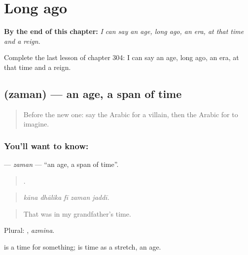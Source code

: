 
\chapter{Long ago}
\label{ch:ar-long-ago}

\begin{chapteropening}
\textbf{By the end of this chapter:} \emph{I can say an age, long ago, an era, at that time and a reign.}

Complete the last lesson of chapter 304: I can say an age, long ago, an era, at that time and a reign.
\end{chapteropening}

\section[\texorpdfstring{\ar{زمن} (zaman)}{زمن (zaman)}]{ (zaman) — an age, a span of time}

\label{lesson:AR-C304-zaman}



\begin{quote}
Before the new one: say the Arabic for a villain, then the Arabic for to imagine.
\end{quote}

\subsection*{You'll want to know: }
\textbf{} — \emph{zaman} — \textquotedblleft{}an age, a span of time\textquotedblright{}.

\begin{quote}
    .
\end{quote}

\begin{quote}
\emph{kāna dhālika fī zaman jaddī.}
\end{quote}

\begin{quote}
That was in my grandfather’s time.
\end{quote}

Plural: , \emph{azmina}.

 is a time for something;  is time as a stretch, an age.

